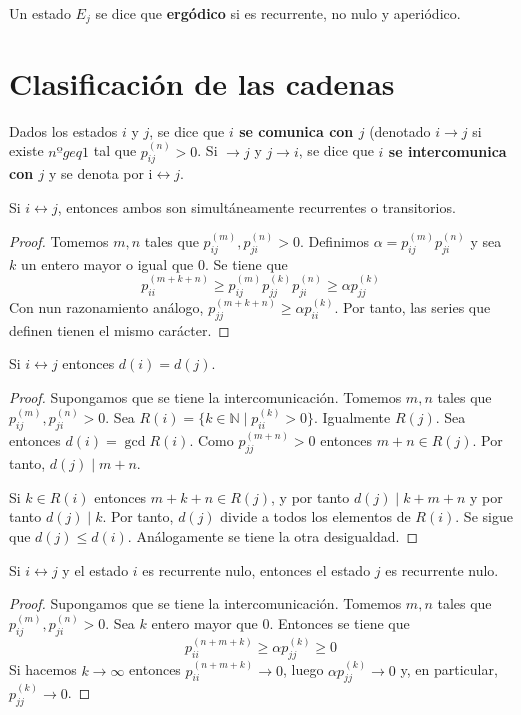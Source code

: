 \documentclass[PREyA.tex]{subfiles}
\begin{document}
\newpage
\begin{defi}
Un estado $E_j$ se dice que \textbf{ergódico} si es recurrente, no nulo y aperiódico.
\end{defi}

\section{Clasificación de las cadenas}
\begin{defi}
Dados los estados $i$ y $j$, se dice que \textbf{$i$ se comunica con $j$} (denotado $i\to j$ si existe $nºgeq 1$ tal que $p_{ij}^{(n)}>0$. Si $\to j$ y $j\to i$, se dice que \textbf{$i$ se intercomunica con $j$}  y se denota por i$\leftrightarrow j$.
\end{defi}
\begin{prop}
Si $i\leftrightarrow j$, entonces ambos son simultáneamente recurrentes o transitorios.
\end{prop}
\begin{proof}
Tomemos $m,n$ tales que $p^{(m)}_{ij},p^{(n)}_{ji}>0$. Definimos $\alpha =p^{(m)}_{ij}p^{(n)}_{ji}$ y sea $k$ un entero mayor o igual que $0$. Se tiene que 
$$
p_{ii}^{(m+k+n)} \geq p^{(m)}_{ij}p_{jj}^{(k)}p^{(n)}_{ji}\geq \alpha p_{jj}^{(k)}
$$
Con nun razonamiento análogo, $p_{jj}^{(m+k+n)}\geq \alpha p_{ii}^{(k)}$. Por tanto, las series que definen tienen el mismo carácter.
\end{proof}
\begin{prop}
Si $i\leftrightarrow j$ entonces $d(i)=d(j)$.
\end{prop}
\begin{proof}
Supongamos que se tiene la intercomunicación. Tomemos $m,n$ tales que $p^{(m)}_{ij},p^{(n)}_{ji}>0$. Sea $R(i) = \{k\in \mathbb{N} \mid p_{ii}^{(k)}>0\}$. Igualmente $R(j)$. Sea entonces $d(i)=\gcd R(i)$. Como $p_{jj}^{(m+n)}>0$ entonces $m+n \in R(j)$. Por tanto, $d(j)\mid m+n$.

Si $k\in R(i)$ entonces $m+k+n \in R(j)$, y por tanto $d(j)\mid k+m+n$ y por tanto $d(j)\mid k$. Por tanto, $d(j)$ divide a todos los elementos de $R(i)$. Se sigue que $d(j) \leq d(i)$. Análogamente se tiene la otra desigualdad.
\end{proof}
\begin{prop}
Si $i\leftrightarrow j$ y el estado $i$ es recurrente nulo, entonces el estado $j$ es recurrente nulo.
\end{prop}
\begin{proof}
Supongamos que se tiene la intercomunicación. Tomemos $m,n$ tales que $p^{(m)}_{ij},p^{(n)}_{ji}>0$. Sea $k$ entero mayor que $0$. Entonces se tiene que
$$
p_{ii}^{(n+m+k)} \geq \alpha p_{jj}^{(k)}\geq 0
$$
Si hacemos $k\to \infty$ entonces $p_{ii}^{(n+m+k)} \to 0$, luego $\alpha p_{jj}^{(k)} \to 0$ y, en particular, $p_{jj}^{(k)} \to 0$.
\end{proof}
\end{document}
